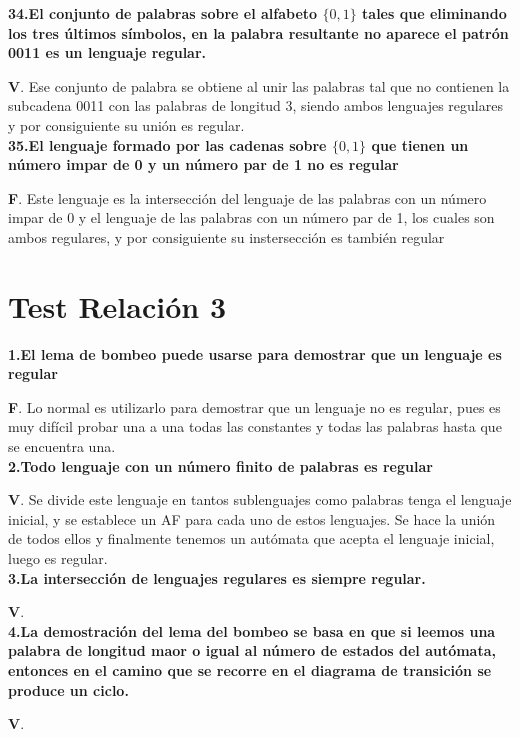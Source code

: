\documentclass[a4paper,11pt]{article}
\begin{document}
\textbf{34.El conjunto de palabras sobre el alfabeto $\{0,1\}$ tales que eliminando los tres últimos símbolos, en la palabra resultante no aparece el patrón 0011 es un lenguaje regular.}

\textbf{V}. Ese conjunto de palabra se obtiene al unir las palabras tal que no contienen la subcadena 0011 con las palabras de longitud 3, siendo ambos lenguajes regulares y por consiguiente su unión es regular. \\

\textbf{35.El lenguaje formado por las cadenas sobre $\{0,1\}$ que tienen un número impar de 0 y un número par de 1 no es regular}

\textbf{F}. Este lenguaje es la intersección del lenguaje de las palabras con un número impar de 0 y el lenguaje de las palabras con un número par de 1, los cuales son ambos regulares, y por consiguiente su instersección es también regular

\section{Test Relación 3}

\textbf{1.El lema de bombeo puede usarse para demostrar que un lenguaje es regular}

\textbf{F}. Lo normal es utilizarlo para demostrar que un lenguaje no es regular, pues es muy difícil probar una a una todas las constantes y todas las palabras hasta que se encuentra una. \\

\textbf{2.Todo lenguaje con un número finito de palabras es regular}

\textbf{V}. Se divide este lenguaje en tantos sublenguajes como palabras tenga el lenguaje inicial, y se establece un AF para cada uno de estos lenguajes. Se hace la unión de todos ellos y finalmente tenemos un autómata que acepta el lenguaje inicial, luego es regular. \\

\textbf{3.La intersección de lenguajes regulares es siempre regular.}

\textbf{V}. \\

\textbf{4.La demostración del lema del bombeo se basa en que si leemos una palabra de longitud maor o igual al número de estados del autómata, entonces en el camino que se recorre en el diagrama de transición se produce un ciclo.}

\textbf{V}. \\
\end{document}
